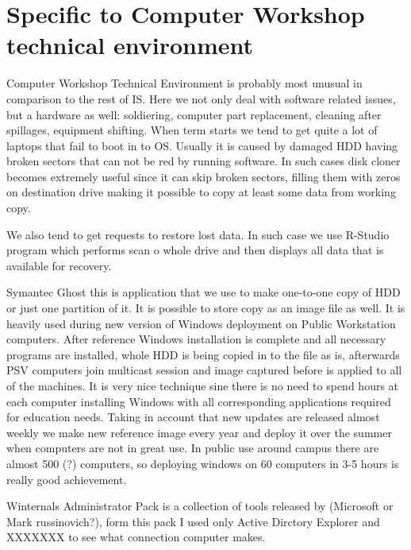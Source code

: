 \documentclass[10pt,a4paper,headinclude=true]{report}
\begin{document}
\section{Specific to Computer Workshop technical environment}
Computer Workshop Technical Environment is probably most unusual in comparison to the rest of IS. Here we not only deal with software related issues, but a hardware as well: soldiering, computer part replacement, cleaning after spillages, equipment shifting.
When term starts we tend to get quite a lot of laptops that fail to boot in to OS. Usually it is caused by damaged HDD having broken sectors that can not be red by running software. In such cases disk cloner becomes extremely useful since it can skip broken sectors, filling them with zeros on destination drive making it possible to copy at least some data from working copy.

We also tend to get requests to restore lost data. In such case we use R-Studio program which performs scan o whole drive and then displays all data that is available for recovery.

Symantec Ghost this is application that we use to make one-to-one copy of HDD or just one partition of it. It is possible to store copy as an image file as well. It is heavily used during new version of Windows deployment on Public Workstation computers. After reference Windows installation is complete and all necessary programs are installed, whole HDD is being copied in to the file as is, afterwards PSV computers join multicast session and image captured before is applied to all of the machines. It is very nice technique sine there is no need to spend hours at each computer installing Windows with all corresponding applications required for education needs. Taking in account that new updates are released almost weekly we make new reference image every year and deploy it over the summer when computers are not in great use. In public use around campus there are almost 500 (?) computers, so deploying windows on 60 computers in 3-5 hours is really good achievement.

Winternals Administrator Pack is a collection of tools released  by (Microsoft or Mark russinovich?), form this pack I used only Active Dirctory Explorer and XXXXXXX to see what connection computer makes.
\end{document}
